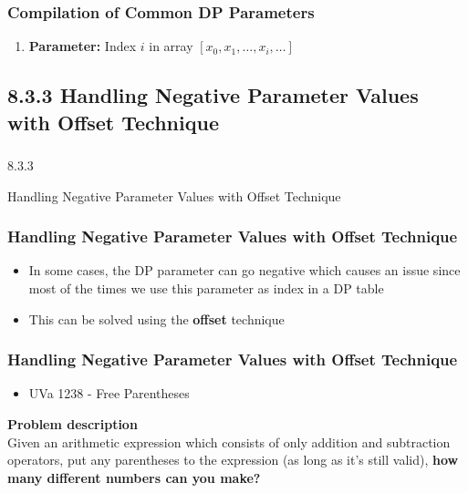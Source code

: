\documentclass{beamer}
\begin{document}
\begin{frame}[fragile]
\frametitle{Compilation of Common DP Parameters}

\begin{enumerate}
    \item \textbf{Parameter:} Index $i$ in array $[x_0, x_1, \ldots, x_i, \ldots]$
\end{enumerate}

\end{frame}



\subsection{8.3.3 Handling Negative Parameter Values with Offset Technique}

\begin{frame}
\frametitle{}
\color{blue}
\centerline{\Large{8.3.3}}
\vspace{0.3cm} 
\centerline{\Large{Handling Negative Parameter Values with Offset Technique}}
\color{black}
\end{frame}

\begin{frame}[fragile]
\frametitle{Handling Negative Parameter Values with Offset Technique}

\begin{itemize}
	\item In some cases, the DP parameter can go negative which causes an issue since most of the times we use this parameter as index in a DP table
    \item This can be solved using the \textbf{offset} technique
\end{itemize}

\end{frame}

\begin{frame}[fragile]
\frametitle{Handling Negative Parameter Values with Offset Technique}

\begin{itemize}
    \item \color{blue}UVa 1238 - Free Parentheses\color{black}
\end{itemize}

\vspace{0.3cm}

\color{red}\textbf{Problem description}\color{black} \\

Given an arithmetic expression which consists of only addition and subtraction operators, put any parentheses to the expression (as long as it's still valid), \textbf{how many different numbers can you make?}

\vspace{0.3cm}

\end{frame}
\end{document}
